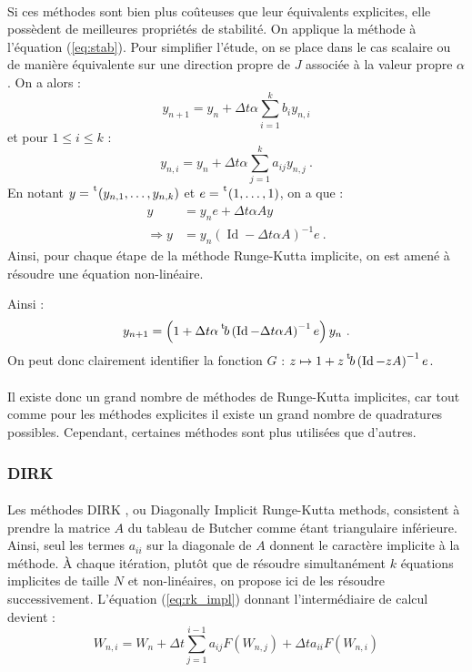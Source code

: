     \paragraph{}
    Si ces méthodes sont bien plus coûteuses que leur équivalents explicites, elle possèdent de meilleures propriétés de stabilité.
    On applique la méthode à l'équation (\ref{eq:stab}).
    Pour simplifier l'étude, on se place dans le cas scalaire ou de manière équivalente sur une direction propre de $J$ associée à la valeur propre $\alpha$.
    On a alors :
    \[y_{n+1} = y_n + \Delta t\alpha \sum_{i = 1}^k b_iy_{n,i}\]
    et pour $1\leq i\leq k$ :
    \[y_{n,i} = y_n + \Delta t\alpha \sum_{j = 1}^k a_{ij}y_{n,j}\ .\]
    En notant $y = \mskip1mu\prescript{\smash{\mathrm t\mkern-3mu}}{}{\mathstrut\left(y_{n,1}, \dots, y_{n,k}\right)}$ et $e = \mskip1mu\prescript{\smash{\mathrm t\mkern-3mu}}{}{\mathstrut\left(1, \dots, 1\right)}$, on a que :
    \begin{align*}
      y &= y_ne + \Delta t\alpha Ay \\
      \Rightarrow y &= y_n\left(\operatorname{Id} - \Delta t\alpha A\right)^{-1}e\ .
    \end{align*}    Ainsi, pour chaque étape de la méthode Runge-Kutta implicite, on est amené à résoudre une équation non-linéaire.

    Ainsi :
    \[y_{n+1} = \left(1 + \Delta t\alpha\mskip1mu\prescript{\smash{\mathrm t\mkern-3mu}}{}{\mathstrut b}\left(\operatorname{Id} - \Delta t\alpha A\right)^{-1}e\right)y_n\ .\]
    On peut donc clairement identifier la fonction $G$ : $z \mapsto 1 + z\mskip1mu\prescript{\smash{\mathrm t\mkern-3mu}}{}{\mathstrut b}\left(\operatorname{Id} - zA\right)^{-1}e$.

    \paragraph{}
    Il existe donc un grand nombre de méthodes de Runge-Kutta implicites, car tout comme pour les méthodes explicites il existe un grand nombre de quadratures possibles.
    Cependant, certaines méthodes sont plus utilisées que d'autres.

    \subsubsection{DIRK}

      \paragraph{}
      Les méthodes DIRK \cite{Alexander1977}, ou Diagonally Implicit Runge-Kutta methods, consistent à prendre la matrice $A$ du tableau de Butcher comme étant triangulaire inférieure.
      Ainsi, seul les termes $a_{ii}$ sur la diagonale de $A$ donnent le caractère implicite à la méthode.
      À chaque itération, plutôt que de résoudre simultanément $k$ équations implicites de taille $N$ et non-linéaires, on propose ici de les résoudre successivement.
      L'équation (\ref{eq:rk_impl}) donnant l'intermédiaire de calcul devient :
      \begin{equation}\label{eq:rk_dirk}
        W_{n,i} = W_n + \Delta t\sum_{j = 1}^{i-1}a_{ij}F\left(W_{n,j}\right) + \Delta ta_{ii}F\left(W_{n,i}\right)
      \end{equation}

